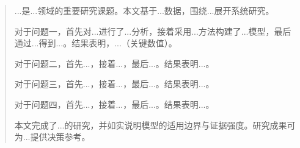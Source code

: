 %
\begin{abstract}

...是...领域的重要研究课题。本文基于...数据，围绕...展开系统研究。

对于问题一，首先对...进行了...分析，接着采用...方法构建了...模型，最后通过...得到...。结果表明，...（关键数值）。

对于问题二，首先...，接着...，最后...。结果表明...。

对于问题三，首先...，接着...，最后...。结果表明...。

对于问题四，首先...，接着...，最后...。结果表明...。


本文完成了...的研究，并如实说明模型的适用边界与证据强度。研究成果可为...提供决策参考。



\label{abstract:end}
\end{abstract}
